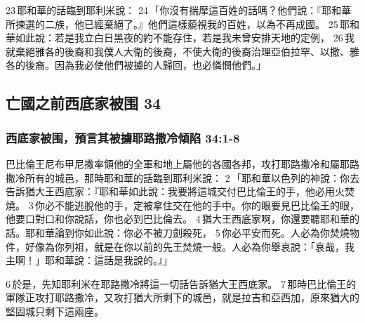 23 耶和華的話臨到耶利米說： 24 「你沒有揣摩這百姓的話嗎？他們說：『耶和華所揀選的二族，他已經棄絕了。』他們這樣藐視我的百姓，以為不再成國。 25 耶和華如此說：若是我立白日黑夜的約不能存住，若是我未曾安排天地的定例， 26 我就棄絕雅各的後裔和我僕人大衛的後裔，不使大衛的後裔治理亞伯拉罕、以撒、雅各的後裔。因為我必使他們被擄的人歸回，也必憐憫他們。」


\subsection{亡國之前西底家被围 34}
\subsubsection{西底家被围，預言其被擄耶路撒冷傾陷 34:1-8}
巴比倫王尼布甲尼撒率領他的全軍和地上屬他的各國各邦，攻打耶路撒冷和屬耶路撒冷所有的城邑，那時耶和華的話臨到耶利米說： 2 「耶和華以色列的神說：你去告訴猶大王西底家：『耶和華如此說：我要將這城交付巴比倫王的手，他必用火焚燒。 3 你必不能逃脫他的手，定被拿住交在他的手中。你的眼要見巴比倫王的眼，他要口對口和你說話，你也必到巴比倫去。 4 猶大王西底家啊，你還要聽耶和華的話。耶和華論到你如此說：你必不被刀劍殺死， 5 你必平安而死。人必為你焚燒物件，好像為你列祖，就是在你以前的先王焚燒一般。人必為你舉哀說：「哀哉，我主啊！」耶和華說：這話是我說的。』」

6 於是，先知耶利米在耶路撒冷將這一切話告訴猶大王西底家。 7 那時巴比倫王的軍隊正攻打耶路撒冷，又攻打猶大所剩下的城邑，就是拉吉和亞西加，原來猶大的堅固城只剩下這兩座。

